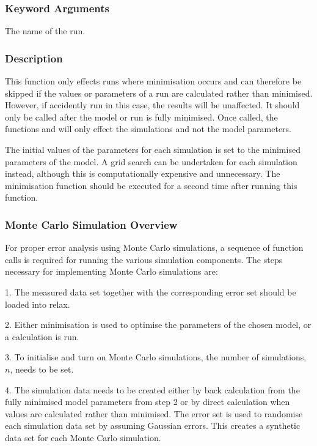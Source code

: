 \subsubsection{Keyword Arguments}


  The name of the run.

\subsubsection{Description}

This function only effects runs where minimisation  occurs and can therefore be skipped if
the values or parameters of a run are calculated rather than minimised.   However, if
accidently run in this case, the results will be unaffected.  It should only be called after
the model or run is fully minimised.   Once called, the functions 
 and
 will only effect the simulations and not the model parameters.

The initial values of the parameters for each simulation is set to the minimised  parameters
of the model.  A grid search can be undertaken for each simulation instead, although this
is computationally expensive and unnecessary.  The minimisation  function should be executed
for a second time after running this function.



\subsubsection{Monte Carlo Simulation Overview}

For proper error analysis using Monte Carlo simulations, a sequence  of function calls is
required for running the various simulation components.  The steps necessary for
implementing Monte Carlo simulations are:

1.  The measured data set together with the corresponding error set should be loaded into
relax.

2.  Either minimisation  is used to optimise  the parameters of the chosen model, or a
calculation is run.

3.  To initialise and turn on Monte Carlo simulations, the number of simulations, $n$, needs
to be set.

4.  The simulation data needs to be created either by back calculation from the fully
minimised  model parameters from step 2 or by direct calculation when values are calculated
rather than minimised.   The error set is used to randomise each simulation data set by
assuming Gaussian errors.  This creates a synthetic data set for each Monte Carlo
simulation.

